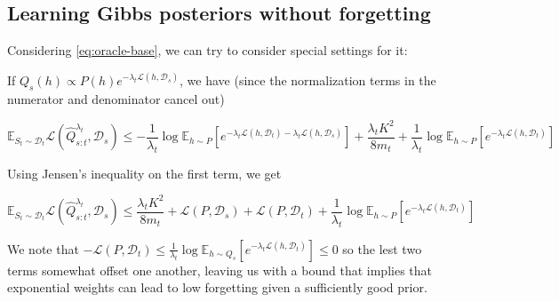 \documentclass[letterpaper]{article}
\theoremstyle{definition}
\begin{document}
\subsection{Learning Gibbs posteriors without forgetting}

Considering \eqref{eq:oracle-base}, we can try to consider special settings for it:

If $Q_s(h)\propto P(h)e^{-\lambda_t\mathcal{L}(h,\mathcal{D}_s)}$, we have (since the normalization terms in the numerator and denominator cancel out)

\begin{equation*} 
\mathbb{E}_{S_t\sim \mathcal{D}_t}\mathcal{L}( \hat{Q}^{\lambda_t}_{s:t},\mathcal{D}_s)\leq -\frac{1}{\lambda_t}\log \mathbb{E}_{h\sim P}\left [e^{-\lambda_t\mathcal{L}(h,\mathcal{D}_t)-\lambda_t\mathcal{L}(h,\mathcal{D}_s)}\right ]+\frac{\lambda_t K^2}{8m_t}+\frac{1}{\lambda_t}\log\mathbb{E}_{h\sim P}\left [e^{-\lambda_t\mathcal{L}(h,\mathcal{D}_t)} \right ]
\end{equation*}

Using Jensen's inequality on the first term, we get

\begin{equation} 
\mathbb{E}_{S_t\sim \mathcal{D}_t}\mathcal{L}( \hat{Q}^{\lambda_t}_{s:t},\mathcal{D}_s)\leq \frac{\lambda_t K^2}{8m_t}+\mathcal{L}(P,\mathcal{D}_s)+\mathcal{L}(P,\mathcal{D}_t) +\frac{1}{\lambda_t}\log\mathbb{E}_{h\sim P}\left [e^{-\lambda_t\mathcal{L}(h,\mathcal{D}_t)} \right ]
\end{equation}

We note that $-\mathcal{L}(P,\mathcal{D}_t)\leq\frac{1}{\lambda_t}\log\mathbb{E}_{h\sim Q_s}\left [e^{-\lambda_t\mathcal{L}(h,\mathcal{D}_t)} \right ]\leq 0$ so the lest two terms somewhat offset one another, leaving us with a bound that implies that exponential weights can lead to low forgetting given a sufficiently good prior.


\end{document}
